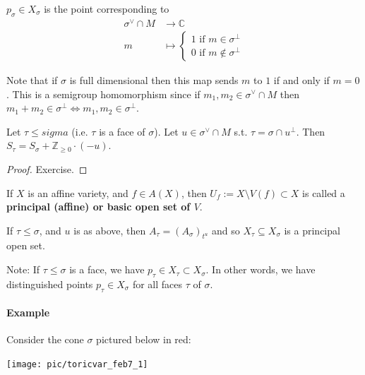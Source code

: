 \documentclass[a4paper,12pt]{amsart}
\newcommand{\ZZ}{\mathbb{Z}}
\newcommand{\CC}{\mathbb{C}}
\begin{document}
\begin{Def}
$p_\sigma \in X_\sigma$ is the point corresponding to 
\begin{align*}
\sigma^\vee \cap M &\to \CC \\
m &\mapsto \begin{cases}
1 \text{ if } m \in \sigma^\perp \\
0 \text{ if } m \not \in \sigma^\perp
\end{cases}
\end{align*}
\end{Def}
Note that if $\sigma$ is full dimensional then this map sends $m$ to $1$ if and only if $m = 0$. This is a semigroup homomorphism since if $m_1, m_2 \in \sigma^\vee \cap M$ then $m_1 + m_2 \in \sigma^\perp \iff m_1, m_2 \in \sigma^\perp$.

\begin{Proposition}
	Let $\tau \leq sigma$ (i.e. $\tau$ is a face of $\sigma$). Let $u \in \sigma^\vee \cap M$ s.t. $\tau = \sigma \cap u^\perp$. Then $S_\tau = S_\sigma + \ZZ_{\geq 0} \cdot (-u)$. 
\end{Proposition}
\begin{proof}
Exercise.
\end{proof}

\begin{Def}
If $X$ is an affine variety, and $f \in A(X)$, then $U_f := X \setminus V(f) \subset X$ is called a \textbf{ principal (affine) or basic open set of $V$}.
\end{Def}

\begin{Corollary}
If $\tau \leq \sigma$, and $u$ is as above, then $A_\tau = (A_\sigma)_{t^{u}}$ and so $X_\tau \subseteq X_\sigma$ is a principal open set. 
\end{Corollary}
Note: If $\tau \leq \sigma$ is a face, we have $p_\tau \in X_\tau \subset X_\sigma$. In other words, we have distinguished points $p_\tau \in X_\sigma$ for all faces $\tau$ of $\sigma$.

\paragraph{Example}
Consider the cone $\sigma$ pictured below in red:

\begin{center}
	\texttt{[image: pic/toricvar\_feb7\_1]}
\end{center}
\end{document}
